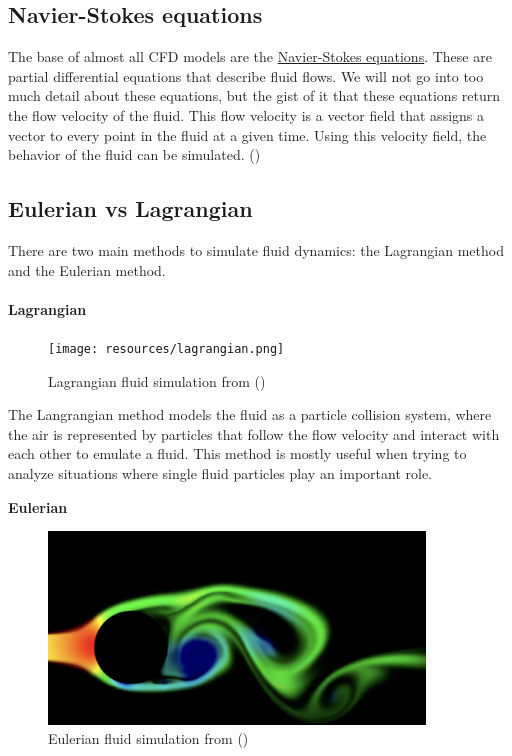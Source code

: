 \documentclass[a4paper,12pt,titlepage]{article}
\begin{document}
\subsection{Navier-Stokes equations} \label{navierstokes}
The base of almost all CFD models are the \href{https://en.wikipedia.org/wiki/Navier%E2%80%93Stokes_equations}{Navier-Stokes equations}.
These are partial differential equations that describe fluid flows. 
We will not go into too much detail about these equations, but the gist of it that these equations return the flow velocity of the fluid.
This flow velocity is a vector field that assigns a vector to every point in the fluid at a given time. 
Using this velocity field, the behavior of the fluid can be simulated.
(\cite{navierstokes})

\subsection{Eulerian vs Lagrangian} \label{eulerianlagrangian}
There are two main methods to simulate fluid dynamics: the Lagrangian method and the Eulerian method.

\paragraph{Lagrangian}\mbox{}

\begin{figure}[H]
	\centering
	\texttt{[image: resources/lagrangian.png]}
	\caption{Lagrangian fluid simulation from (\cite{seblague})}
\end{figure}

The Langrangian method models the fluid as a particle collision system, where the air is represented by
particles that follow the flow velocity and interact with each other to emulate a fluid. 
This method is mostly useful when trying to analyze situations where single fluid particles play an important role.

\pagebreak
\textbf{Eulerian} \\

\begin{figure}[H]
	\centering
	\includegraphics[width=10cm]{resources/eulerian.png}
	\caption{Eulerian fluid simulation from (\cite{tenminute})}
\end{figure}
\end{document}

